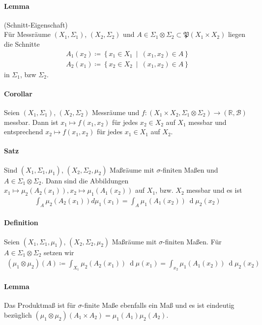 \documentclass[12pt,a4paper,fleqn]{article}
\def\set#1{{\left\{ #1 \right\}}}
\def\Mid{\ \middle|\ }
\def\d{{\operatorname{d}}}
\begin{document}
\paragraph{Lemma} (Schnitt-Eigenschaft)\\
Für Messräume $(X_1, \Sigma_1)$, $(X_2, \Sigma_2)$ und $A \in \Sigma_1 \otimes \Sigma_2 \subset \mathfrak{P}(X_1 \times X_2)$ liegen die Schnitte
\begin{align*}
A_1(x_2) \coloneqq \set{x_1 \in X_1 \Mid (x_1, x_2) \in A} 
\end{align*}
\begin{align*}
A_2(x_1) \coloneqq \set{x_2 \in X_2 \Mid (x_1, x_2) \in A} 
\end{align*}
in $\Sigma_1$, bzw $\Sigma_2$.

\paragraph{Corollar} Seien $(X_1, \Sigma_1)$, $(X_2, \Sigma_2)$ Messräume und ${f\colon (X_1 \times X_2, \Sigma_1 \otimes \Sigma_2) \rightarrow (\mathbb{R}, \mathcal{B})}$ messbar. Dann ist $x_1 \mapsto f(x_1, x_2)$ für jedes $x_2 \in X_2$ auf $X_1$ messbar und entsprechend $x_2 \mapsto f(x_1, x_2)$ für jedes $x_1 \in X_1$ auf $X_2$.

\paragraph{Satz} Sind $(X_1, \Sigma_1, \mu_1)$, $(X_2, \Sigma_2, \mu_2)$ Maßräume mit $\sigma$-finiten Maßen und ${A \in \Sigma_1 \otimes \Sigma_2}$. Dann sind die Abbildungen $x_1 \mapsto \mu_2(A_2(x_1)), x_2 \mapsto \mu_1(A_1(x_2))$ auf $X_1$, bzw. $X_2$ messbar und es ist
\begin{align*}
\int_A \mu_2(A_2(x_1)) d\mu_1(x_1) = \int_A \mu_1(A_1(x_2))\ \d\mu_2(x_2)
\end{align*}

\paragraph{Definition} Seien $(X_1, \Sigma_1, \mu_1)$, $(X_2, \Sigma_2, \mu_2)$ Maßräume mit $\sigma$-finiten Maßen. Für $A \in \Sigma_1 \otimes \Sigma_2$ setzen wir 
\begin{align*}
(\mu_1 \otimes \mu_2)(A) \coloneqq \int_{X_1} \mu_2(A_2(x_1))\ \d\mu(x_1) = \int_{x_2} \mu_1(A_1(x_2))\ \d\mu_2(x_2)
\end{align*}

\paragraph{Lemma} Das Produktmaß ist für $\sigma$-finite Maße ebenfalls ein Maß und es ist eindeutig bezüglich $(\mu_1 \otimes \mu_2)(A_1 \times A_2) = \mu_1(A_1) \mu_2(A_2)$.
\end{document}
